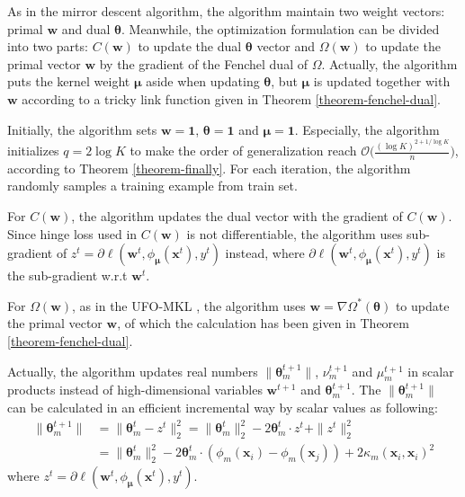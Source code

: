 \documentclass{article}
\begin{document}
 As in the mirror descent algorithm, the algorithm maintain two weight vectors: primal $\mathbf w$ and dual $\pmb{\theta}$.
 Meanwhile, the optimization formulation can be divided into two parts: $C(\mathbf w)$
 to update the dual $\pmb{\theta}$ vector and $\Omega(\mathbf w)$ to update the primal vector $\mathbf w$ by
 the gradient of the Fenchel dual of $\Omega$.
 Actually, the algorithm puts the kernel weight $\pmb{\mu}$ aside when updating $\pmb{\theta}$,
 but $\pmb{\mu}$ is updated together with $\mathbf w$ according to a tricky link function given in Theorem \ref{theorem-fenchel-dual}.

Initially, the algorithm sets $\mathbf{w}=\mathbf{1}$, $\pmb{\theta}=\mathbf{1}$ and $\pmb{\mu}=\mathbf{1}$.
Especially, the algorithm initializes $q=2\log K$ to make the order of generalization reach
$\mathcal{O}\big(\frac{(\log K)^{2+1/\log K}}{n}\big)$, according to Theorem \ref{theorem-finally}.
For each iteration, the algorithm randomly samples a training example from train set.

For $C(\mathbf w)$, the algorithm updates the dual vector with the gradient of $C(\mathbf w)$.
Since hinge loss used in $C(\mathbf w)$ is not differentiable,
the algorithm uses sub-gradient of $z^t=\partial\ell(\mathbf w^t,\phi_{\bm \mu}(\mathbf{x}^t), y^t)$ instead,
where $\partial\ell(\mathbf w^t,\phi_{\bm \mu}(\mathbf{x}^t), y^t)$ is the sub-gradient w.r.t $\mathbf w^t$.

For $\Omega(\mathbf w)$, as in the UFO-MKL \cite{OrabonaL11},
the algorithm uses $\mathbf w=\nabla\Omega^\ast(\pmb{\theta})$ to update the primal vector $\mathbf w$,
of which the calculation has been given in Theorem \ref{theorem-fenchel-dual}.

Actually, the algorithm updates real numbers $\|\bm \theta_m^{t+1}\|$, $\nu_m^{t+1}$ and $\mu_m^{t+1}$ in scalar products instead of
high-dimensional variables $\mathbf w^{t+1}$ and $\bm \theta_m^{t+1}$.
The $\|\bm \theta_m^{t+1}\|$ can be calculated in an efficient incremental way by scalar values as following:
\begin{align*}
\|\pmb{\theta}_m^{t+1}\|
&=\|\pmb{\theta}_m^{t}-z^t\|_2^2
=\|\pmb{\theta}_m^{t}\|_2^2-2\pmb{\theta}_m^t \cdot z^t +\|z^t\|_2^2\\
&=\|\pmb{\theta}_m^{t}\|_2^2-2\pmb{\theta}_m^t \cdot (\phi_m(\mathbf{x}_i)-\phi_m(\mathbf{x}_j))
+ 2\kappa_m(\mathbf{x}_i, \mathbf{x}_i)^2
\end{align*}
where $z^t=\partial\ell(\mathbf w^t,\phi_{\bm \mu}(\mathbf{x}^t), y^t)$.
\end{document}

